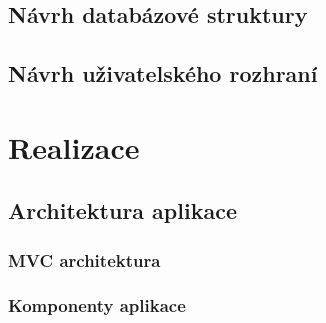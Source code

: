 \documentclass[czech,BP]{thesiskiv}
\begin{document}
	\subsection{Návrh databázové struktury}
	\subsection{Návrh uživatelského rozhraní}
\section{Realizace}
	\subsection{Architektura aplikace}
		\subsubsection{MVC architektura}
		\subsubsection{Komponenty aplikace}
% 
%

{\raggedright\small

}
\end{document}
